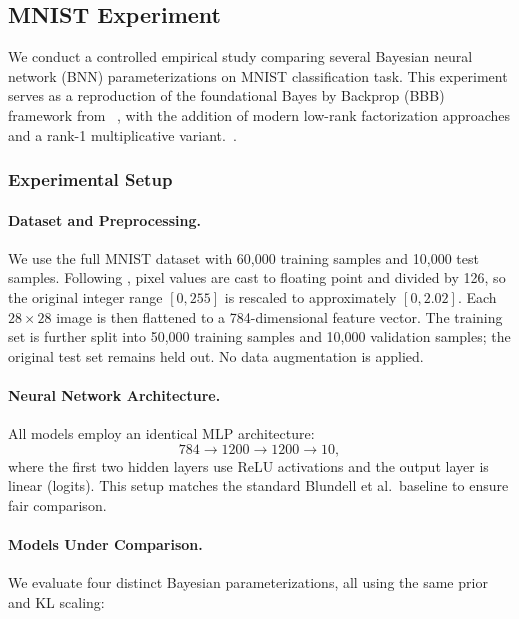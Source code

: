 \documentclass{article}
\theoremstyle{plain}
\theoremstyle{definition}
\theoremstyle{remark}
\begin{document}
\subsection{MNIST Experiment}\label{app:results:mnist}

We conduct a controlled empirical study comparing several Bayesian neural network (BNN) parameterizations on MNIST classification task. This experiment serves as a reproduction of the foundational Bayes by Backprop (BBB) framework from ~\cite{blundell2015weight}, with the addition of modern low-rank factorization approaches and a rank-1 multiplicative variant.~\cite{dusenberry2020efficient}.

\subsubsection{Experimental Setup}

\paragraph{Dataset and Preprocessing.}
We use the full MNIST dataset \cite{lecun1998gradient} with 60,000 training samples and 10,000 test samples. Following \cite{blundell2015weight}, pixel values are cast to floating point and divided by 126, so the original integer range $[0,255]$ is rescaled to approximately $[0,2.02]$. Each $28 \times 28$ image is then flattened to a 784-dimensional feature vector. The training set is further split into 50,000 training samples and 10,000 validation samples; the original test set remains held out. No data augmentation is applied.


\paragraph{Neural Network Architecture.}
All models employ an identical MLP architecture:
\[
784 \to 1200 \to 1200 \to 10,
\]
where the first two hidden layers use ReLU activations and the output layer is linear (logits). This setup matches the standard Blundell et al.\ baseline to ensure fair comparison.

\paragraph{Models Under Comparison.}
We evaluate four distinct Bayesian parameterizations, all using the same prior and KL scaling:
\end{document}
